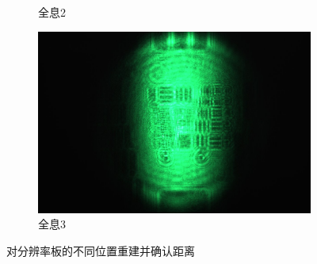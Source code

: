 \documentclass[a4paper,draft]{report} %
\begin{document}
\begin{figure}[H]
\begin{subfigure}{0.3\textwidth}
    \caption{全息2}
    \label{Fig.sub.2}
\end{subfigure}
\hfill
\begin{subfigure}{0.3\textwidth}
    \centering
    \includegraphics[width=\linewidth]{lizhou3}
    \caption{全息3}
    \label{Fig.sub.3}    
\end{subfigure}

\caption{对分辨率板的不同位置重建并确认距离}
\label{Fig.main1}
\end{figure}
\end{document}
